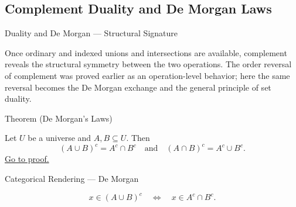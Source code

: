 
\subsection{Complement Duality and De Morgan Laws}

\begin{lratopiccard}{Duality and De Morgan --- Structural Signature}
\begin{lrasignaturetable}
\end{lrasignaturetable}
\end{lratopiccard}

\begin{remark*}[Exposition]
Once ordinary and indexed unions and intersections are available, complement
reveals the structural symmetry between the two operations. The order reversal
of complement was proved earlier as an operation-level behavior; here the same
reversal becomes the De Morgan exchange and the general principle of set
duality.
\end{remark*}

\begin{theorembox}{Theorem (De Morgan's Laws)}
\begin{theorem}\label{thm:de-morgan}
Let $U$ be a universe and $A,B \subseteq U$. Then
\[
(A \cup B)^c = A^c \cap B^c
\quad\text{and}\quad
(A \cap B)^c = A^c \cup B^c.
\]
\hyperref[prf:de-morgan]{Go to proof.}
\end{theorem}
\end{theorembox}

\begin{lracategoricalcard}{Categorical Rendering --- De Morgan}
\begin{center}

\end{center}
\[
  x\in(A\cup B)^c
  \quad\Longleftrightarrow\quad
  x\in A^c\cap B^c.
\]
\end{lracategoricalcard}


